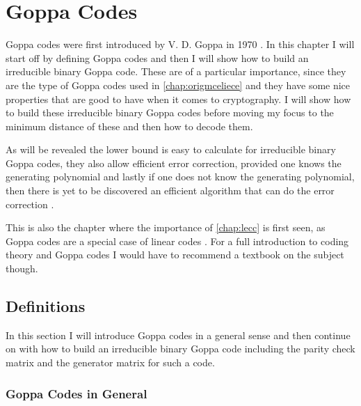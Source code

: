 
\chapter{Goppa Codes}
\label{chap:goppa}

Goppa codes were first introduced by V. D. Goppa in 1970 \cite{goppa}. In this chapter I will start off by defining Goppa codes and then I will show how to build an irreducible binary Goppa code. These are of a particular importance, since they are the type of Goppa codes used in \cref{chap:origmceliece} and they have some nice properties that are good to have when it comes to cryptography. I will show how to build these irreducible binary Goppa codes before moving my focus to the minimum distance of these and then how to decode them.

As will be revealed the lower bound is easy to calculate for irreducible binary Goppa codes, they also allow efficient error correction, provided one knows the generating polynomial and lastly if one does not know the generating polynomial, then there is yet to be discovered an efficient algorithm that can do the error correction \cite{EOS}.

This is also the chapter where the importance of \cref{chap:lecc} is first seen, as Goppa codes are a special case of linear codes \cite{EOS}\cite[p. 140]{vanlint}. For a full introduction to coding theory and Goppa codes I would have to recommend a textbook on the subject though.



\section{Definitions}
\label{sec:defGoppa}

In this section I will introduce Goppa codes in a general sense and then continue on with how to build an irreducible binary Goppa code including the parity check matrix and the generator matrix for such a code.



\subsection{Goppa Codes in General}

